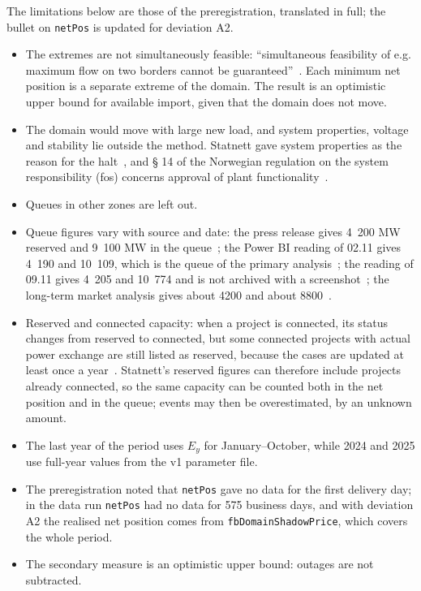 The limitations below are those of the preregistration, translated in full; the bullet on \texttt{netPos} is updated for deviation A2.
\begin{itemize}
\item The extremes are not simultaneously feasible: ``simultaneous feasibility of e.g. maximum flow on two borders cannot be guaranteed''~\cite{jaohb}. Each minimum net position is a separate extreme of the domain. The result is an optimistic upper bound for available import, given that the domain does not move. %
\item The domain would move with large new load, and system properties, voltage and stability lie outside the method. Statnett gave system properties as the reason for the halt~\cite{press}, and § 14 of the Norwegian regulation on the system responsibility (fos) concerns approval of plant functionality~\cite{press}. %
\item Queues in other zones are left out. %
\item Queue figures vary with source and date: the press release gives 4~200 MW reserved and 9~100 MW in the queue~\cite{press}; the Power BI reading of 02.11 gives 4~190 and 10~109, which is the queue of the primary analysis~\cite{pbi}; the reading of 09.11 gives 4~205 and 10~774 and is not archived with a screenshot~\cite{pbi}; the long-term market analysis gives about 4200 and about 8800~\cite{lma}. %
\item Reserved and connected capacity: when a project is connected, its status changes from reserved to connected, but some connected projects with actual power exchange are still listed as reserved, because the cases are updated at least once a year~\cite{pbi}. Statnett's reserved figures can therefore include projects already connected, so the same capacity can be counted both in the net position and in the queue; events may then be overestimated, by an unknown amount. %
\item The last year of the period uses $E_y$ for January--October, while 2024 and 2025 use full-year values from the v1 parameter file. %
\item The preregistration noted that \texttt{netPos} gave no data for the first delivery day; in the data run \texttt{netPos} had no data for 575 business days, and with deviation A2 the realised net position comes from \texttt{fbDomainShadowPrice}, which covers the whole period. %
\item The secondary measure is an optimistic upper bound: outages are not subtracted. %
\end{itemize}

